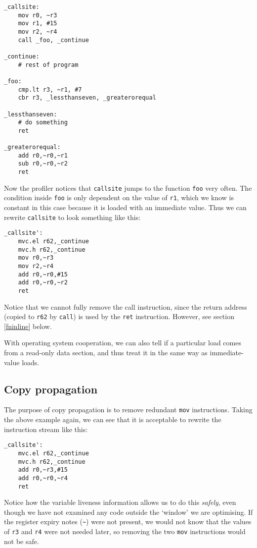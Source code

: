 \begin{verbatim}
_callsite:
    mov r0, ~r3
    mov r1, #15
    mov r2, ~r4
    call _foo, _continue

_continue:
    # rest of program

_foo:
    cmp.lt r3, ~r1, #7
    cbr r3, _lessthanseven, _greaterorequal

_lessthanseven:
    # do something
    ret

_greaterorequal:
    add r0,~r0,~r1
    sub r0,~r0,~r2
    ret
\end{verbatim}

Now the profiler notices that \texttt{callsite} jumps to the function \texttt{foo} very often. The condition inside \texttt{foo} is only dependent on the value of \texttt{r1}, which we know is constant in this case because it is loaded with an immediate value. Thus we can rewrite \texttt{callsite} to look something like this:

\begin{verbatim}
_callsite':
    mvc.el r62,_continue
    mvc.h r62,_continue
    mov r0,~r3
    mov r2,~r4
    add r0,~r0,#15
    add r0,~r0,~r2
    ret
\end{verbatim}

Notice that we cannot fully remove the call instruction, since the return address (copied to \texttt{r62} by \texttt{call}) is used by the \texttt{ret} instruction. However, see section \ref{fninline} below.

With operating system cooperation, we can also tell if a particular load comes from a read-only data section, and thus treat it in the same way as immediate-value loads.

\subsection{\label{cprop}Copy propagation}

The purpose of copy propagation is to remove redundant \texttt{mov} instructions. Taking the above example again, we can see that it is acceptable to rewrite the instruction stream like this:

\begin{verbatim}
_callsite':
    mvc.el r62,_continue
    mvc.h r62,_continue
    add r0,~r3,#15
    add r0,~r0,~r4
    ret
\end{verbatim}

Notice how the variable liveness information allows us to do this \emph{safely}, even though we have not examined any code outside the `window' we are optimising. If the register expiry notes (\texttt{\textasciitilde}) were not present, we would not know that the values of \texttt{r3} and \texttt{r4} were not needed later, so removing the two \texttt{mov} instructions would not be safe.

